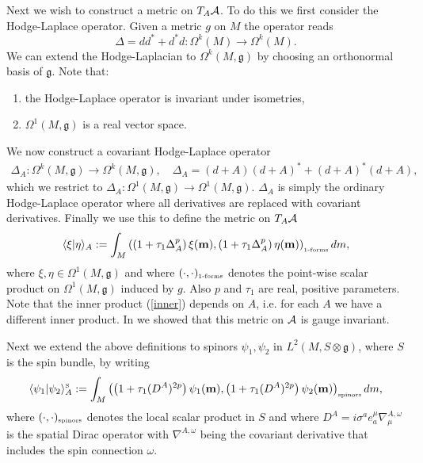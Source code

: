\documentclass[12pt]{article}
\def\m{\mu}
\def\oo{\omega}
\def\OO{\Omega}
\def\ca{{\cal A}}
\begin{document}
Next we wish to construct a metric on $T_A\ca$. To do this we first consider the Hodge-Laplace operator. Given a metric $g$ on $M$ the operator reads 
$$
\Delta = d d^* + d^* d: \OO^k(M)\rightarrow \OO^k(M).
$$
We can extend the Hodge-Laplacian to $\OO^k(M,\mathfrak{g})$ by choosing an orthonormal basis of $\mathfrak{g}$. 
Note that: 
\begin{enumerate}
\item
the Hodge-Laplace operator is invariant under isometries,
\item
$\OO^1(M,\mathfrak{g})$ is a real vector space.
\end{enumerate}
We now  construct a covariant Hodge-Laplace operator 
\begin{eqnarray}
\Delta_{A} : \OO^k(M,\mathfrak{g})\rightarrow \OO^k(M,\mathfrak{g})
,\quad\Delta_{A} = (d+A) (d+A)^* + (d+A)^* (d+A),
\end{eqnarray}
which we restrict to $\Delta_{A}:\OO^1(M,\mathfrak{g})\rightarrow \OO^1(M,\mathfrak{g})$. $\Delta_A$ is simply the ordinary Hodge-Laplace operator where all derivatives are replaced with covariant derivatives. Finally we use this to define the metric on $T_A\ca$ 
\begin{equation}
\langle \xi \vert \eta \rangle_A := \int_M \left(  \left(  1 + \tau_1\Delta_{A}^p\right) \xi({\bf m})         , \left(  1 + \tau_1\Delta_{A}^p\right) \eta({\bf m})   \right)_{\mbox{\tiny 1-forms}}       dm,
\label{inner}
\end{equation}
where $\xi,\eta\in\OO^1(M,\mathfrak{g})$ and where $(\cdot,\cdot)_{\mbox{\tiny 1-forms}} $ denotes the point-wise scalar product on $\OO^1(M,\mathfrak{g})$ induced by $g$. Also $p$ and $\tau_1$ are real, positive parameters.
%
Note that the inner product (\ref{inner}) depends on $A$, i.e. for each $A$ we have a different inner product.
%
In \cite{Aastrup:2019yui} we showed that this metric on $\ca$ is gauge invariant.





Next we extend the above definitions to spinors $\psi_1,\psi_2$ in $L^2(M,S\otimes \mathfrak{g})$, where $S$ is the spin bundle, by writing  
\begin{equation}
\langle \psi_1 \vert \psi_2 \rangle_{A}^{\mbox{\tiny S}} := \int_M \left(  \left(  1 + \tau_1 (D^A) ^{2p}\right) \psi_1({\bf m})         , \left(  1 + \tau_1(D^A) ^{2p}\right) \psi_2({\bf m})   \right)_{\mbox{\tiny spinors}}        dm,
\label{innerspinor}
\end{equation}
where $(\cdot,\cdot)_{\mbox{\tiny spinors}} $ denotes the local scalar product in $S$ and where $D^A=i \sigma^a e^\m_a \nabla^{A,\oo}_\m$ is the spatial Dirac operator with $\nabla^{A,\oo}$ being the covariant derivative that includes the spin connection
$\oo$.
\end{document}
